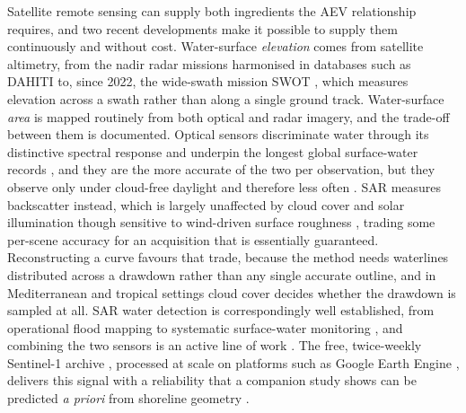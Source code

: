 Satellite remote sensing can supply both ingredients the AEV relationship requires, and two
recent developments make it possible to supply them continuously and without cost.
Water-surface \emph{elevation} comes from satellite altimetry, from the nadir radar missions
harmonised in databases such as DAHITI \citep{Schwatke2015} to, since 2022, the wide-swath
mission SWOT \citep{Biancamaria2016}, which measures elevation across a swath rather than
along a single ground track. Water-surface \emph{area} is mapped routinely from both optical
and radar imagery, and the trade-off between them is documented. Optical sensors discriminate
water through its distinctive spectral response and underpin the longest global surface-water
records \citep{Pekel2016}, and they are the more accurate of the two per observation, but they
observe only under cloud-free daylight and therefore less often \citep{PenaLuque2021}. SAR
measures backscatter instead, which is largely unaffected by cloud cover and solar
illumination \citep{Torres2012, Mullissa2021} though sensitive to wind-driven surface
roughness \citep{McQuillan2025}, trading some per-scene accuracy for an acquisition that is
essentially guaranteed. Reconstructing a curve favours that trade, because the method needs
waterlines distributed across a drawdown rather than any single accurate outline, and in
Mediterranean and tropical settings cloud cover decides whether the drawdown is sampled at
all. SAR water detection is correspondingly well established, from operational flood mapping
\citep{Martinis2015} to systematic surface-water monitoring \citep{Bioresita2018,
PenaLuque2021}, and combining the two sensors is an active line of work
\citep{ValerioEtAl2024, PengEtAl2025}. The free, twice-weekly Sentinel-1 archive
\citep{Torres2012}, processed at scale on platforms such as Google Earth Engine
\citep{Gorelick2017}, delivers this signal with a reliability that a companion study shows
can be predicted \emph{a priori} from shoreline geometry \citep{PaperOne}.


